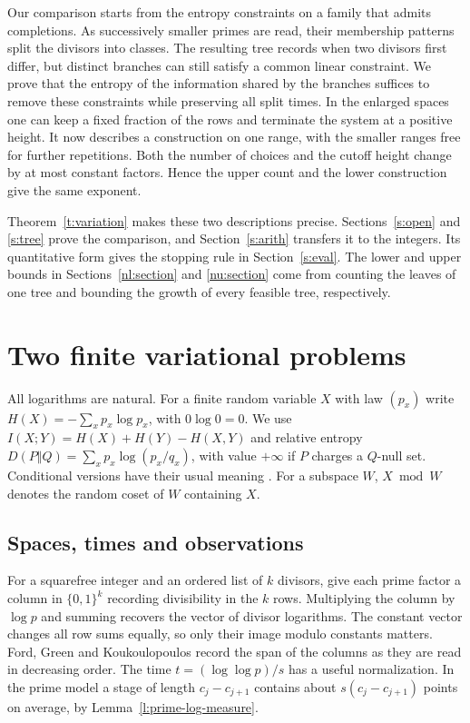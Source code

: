 \documentclass[11pt]{article}
\numberwithin{equation}{section}
\begin{document}
Our comparison starts from the entropy constraints on a family
that admits completions. As successively smaller primes are read, their
membership patterns split the divisors into classes. The resulting
tree records when two divisors first differ, but distinct branches
can still satisfy a common linear constraint. We prove that the
entropy of the information shared by the branches suffices to remove
these constraints while preserving all split times. In the enlarged
spaces one can keep a fixed fraction of the rows and terminate the
system at a positive height. It now describes a construction on one
range, with the smaller ranges free for further repetitions. Both
the number of choices and the cutoff height change by at most
constant factors. Hence the upper count and the lower construction
give the same exponent.

Theorem~\ref{t:variation} makes these two descriptions precise.
Sections~\ref{s:open} and \ref{s:tree} prove the comparison, and
Section~\ref{s:arith} transfers it to the integers. Its quantitative
form gives the stopping rule in Section~\ref{s:eval}. The lower and
upper bounds in Sections~\ref{nl:section} and \ref{nu:section}
come from counting the leaves of one tree and bounding the growth
of every feasible tree, respectively.

\section{Two finite variational problems}\label{s:flags}

All logarithms are natural. For a finite random variable $X$ with
law $(p_x)$ write $H(X)=-\sum_x p_x\log p_x$, with $0\log0=0$.
We use $I(X;Y)=H(X)+H(Y)-H(X,Y)$ and relative entropy
$D(P\Vert Q)=\sum_x p_x\log(p_x/q_x)$, with value $+\infty$ if
$P$ charges a $Q$-null set. Conditional versions have their usual
meaning \cite{ct}. For a subspace $W$, $X\bmod W$ denotes the random
coset of $W$ containing $X$.

\subsection{Spaces, times and observations}

For a squarefree integer and an ordered list of $k$ divisors, give
each prime factor a column in $\{0,1\}^k$ recording divisibility in the
$k$ rows. Multiplying the column by $\log p$ and summing recovers
the vector of divisor logarithms. The constant vector changes
all row sums equally, so only their image modulo constants matters.
Ford, Green and Koukoulopoulos \cite[Sections~3--4]{fgk} record
the span of the columns as they are read in decreasing order.
The time $t=(\log\log p)/s$ has a useful normalization. In the
prime model a stage of length $c_j-c_{j+1}$ contains about
$s(c_j-c_{j+1})$ points on average, by
Lemma~\ref{l:prime-log-measure}.
\end{document}
